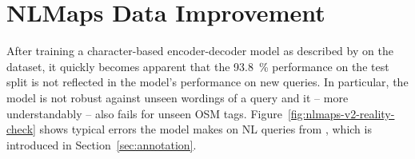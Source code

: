 \chapter{NLMaps Data Improvement}
\label{ch:nlmaps-improvement}

After training a character-based encoder-decoder model as described by
\textcite{staniek-2020} on the \nlmapstwo{} dataset, it quickly becomes apparent
that the \SI{93.8}{\%} performance on the test split is not reflected in the
model’s performance on new queries. In particular, the model is not robust
against unseen wordings of a query and it – more understandably – also fails for
unseen OSM tags. Figure~\ref{fig:nlmaps-v2-reality-check} shows typical errors
the model makes on NL queries from \nlmapsfour{}, which is
introduced in Section~\ref{sec:annotation}.

